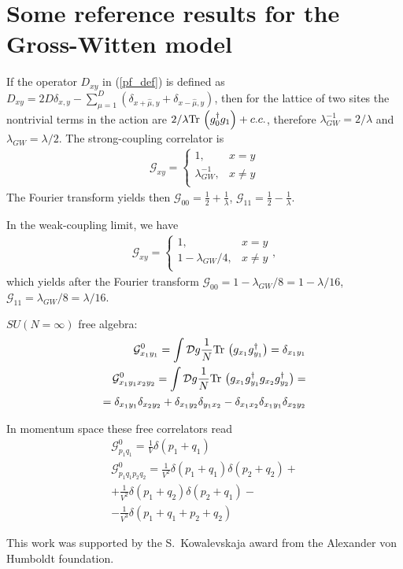 \documentclass[twocolumn,showpacs,preprintnumbers,superscriptaddress,amsmath,floatfix,amssymb,secnumarabic]{revtex4}
\newcommand{\lr}[1]{ \left( #1 \right) }
\newcommand{\tr}{ {\rm Tr} \, }
\begin{document}
\section{Some reference results for the Gross-Witten model}

 If the operator $D_{x y}$ in (\ref{pf_def}) is defined as $D_{x y} = 2 D \delta_{x,y} - \sum\limits_{\mu=1}^{D} \lr{\delta_{x+\hat{\mu},y} + \delta_{x-\hat{\mu},y}}$, then for the lattice of two sites the nontrivial terms in the action are $2/\lambda \tr\lr{g^{\dag}_0 g_1} + c.c.$, therefore $\lambda_{GW}^{-1} = 2/\lambda$ and $\lambda_{GW} = \lambda/2$. The strong-coupling correlator is
\begin{eqnarray}
\label{gw_sc_correlator}
 \mathcal{G}_{xy} =
 \begin{cases}
                  1, & x = y \\
  \lambda_{GW}^{-1}, & x \neq y \\
 \end{cases}
\end{eqnarray}
The Fourier transform yields then $\mathcal{G}_{00} = \frac{1}{2} + \frac{1}{\lambda}$, $\mathcal{G}_{11} = \frac{1}{2} - \frac{1}{\lambda}$.

In the weak-coupling limit, we have
\begin{eqnarray}
\label{gw_sc_correlator}
 \mathcal{G}_{xy} =
 \begin{cases}
                   1, & x = y \\
  1 - \lambda_{GW}/4, & x \neq y \\
 \end{cases} ,
\end{eqnarray}
which yields after the Fourier transform $\mathcal{G}_{00} = 1 - \lambda_{GW}/8 = 1 - \lambda/16$, $\mathcal{G}_{11} = \lambda_{GW}/8 = \lambda/16$.

$SU\lr{N=\infty}$ free algebra:
\begin{eqnarray}
\label{sun_free_algebra}
 \mathcal{G}^{0}_{x_1 y_1} = \int\mathcal{D}g \frac{1}{N} \tr\lr{g_{x_1} g^{\dag}_{y_1}}
 = \delta_{x_1 y_1}
\nonumber \\
 \mathcal{G}^{0}_{x_1 y_1 x_2 y_2} = \int\mathcal{D}g \frac{1}{N} \tr\lr{g_{x_1} g^{\dag}_{y_1} g_{x_2} g^{\dag}_{y_2}}
 = \nonumber \\ =
 \delta_{x_1 y_1} \delta_{x_2 y_2} + \delta_{x_1 y_2} \delta_{y_1 x_2} - \delta_{x_1 x_2} \delta_{x_1 y_1} \delta_{x_2 y_2}
\end{eqnarray}

In momentum space these free correlators read
\begin{eqnarray}
\label{sun_free_algebra_mspace}
 \mathcal{G}^{0}_{p_1 q_1} = \frac{1}{V} \delta\lr{p_1 + q_1}
\nonumber \\
 \mathcal{G}^{0}_{p_1 q_1 p_2 q_2} =
 \frac{1}{V^2} \delta\lr{p_1 + q_1} \delta\lr{p_2 + q_2}
 + \nonumber \\ +
 \frac{1}{V^2} \delta\lr{p_1 + q_2} \delta\lr{p_2 + q_1}
 - \nonumber \\ -
 \frac{1}{V^3} \delta\lr{p_1 + q_1 + p_2 + q_2}
\end{eqnarray}

\begin{acknowledgments}
 This work was supported by the S.~Kowalevskaja award from the Alexander von Humboldt foundation.
\end{acknowledgments}



\end{document}
